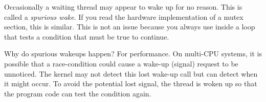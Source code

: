 Occasionally a waiting thread may appear to wake up for no reason. This is called a \emph{spurious wake}.
If you read the hardware implementation of a mutex section, this is similar.
This is not an issue because you always use  inside a loop that tests a condition that must be true to continue.

Why do spurious wakeups happen? For performance.
On multi-CPU systems, it is possible that a race-condition could cause a wake-up (signal) request to be unnoticed.
The kernel may not detect this lost wake-up call but can detect when it might occur.
To avoid the potential lost signal, the thread is woken up so that the program code can test the condition again.

